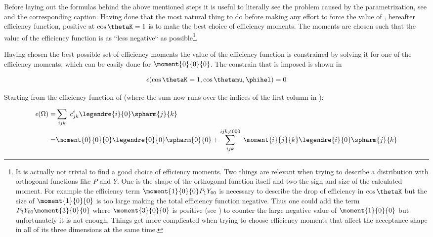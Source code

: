 Before laying out the formulas behind the above mentioned steps it is useful to literally see the problem caused by the parametrization, see 
and the corresponding caption. Having done that the most natural thing to do before making any effort to force the value of , hereafter efficiency function,
positive at $\cos\thetaK=1$ is to make the best choice of efficiency moments. The moments are chosen such that the value of the efficiency function is as ``less negative``
as 
possible\footnote{It is actually not trivial to find a good choice of efficiency moments. Two things are relevant when trying to describe a 
distribution with orthogonal functions like $P$ and $Y$. One is the shape of the orthogonal function itself and two the sign and size of the calculated moment.
For example the efficiency term $\moment{1}{0}{0}P_1Y_{00}$ is necessary to describe the drop of efficiency in $\cos\thetaK$ but the size of $\moment{1}{0}{0}$ 
is too large making the total efficiency function negative. Thus one could add the term $P_3Y_{00}\moment{3}{0}{0}$ where $\moment{3}{0}{0}$ is positive
(see  ) to counter the large negative value of $\moment{1}{0}{0}$ but unfortunately it is not enough. Things get more complicated
when trying to choose efficiency moments that affect the acceptance shape in all of its three dimensions at the same time.
}.

Having chosen the best possible set of efficiency moments the value of the efficiency function is constrained by solving it for
one of the efficiency moments, which can be easily done for $\moment{0}{0}{0}$. The constrain that is imposed is shown in 

\begin{center}
\begin{equation}
  \epsilon(\cos\thetaK = 1, \cos\thetamu, \phihel) = 0 
  \label{eff_func_constr}
\end{equation}
\end{center}

\noindent Starting from the efficiency function of  (where the sum now runs over the indices of the first column in ):

\begin{center}
\begin{align}
  \epsilon(\Omega) =& \sum_{ijk} \; c^i_{jk} \legendre{i}{0} \spharm{j}{k} \nonumber \\
                   =& \moment{0}{0}{0} \legendre{0}{0} \spharm{0}{0} + \sum_{ijk}^{ijk\neq 000} \; \moment{i}{j}{k} \legendre{i}{0} \spharm{j}{k}
  \label{eff_func_rewriten}
\end{align}
\end{center}

